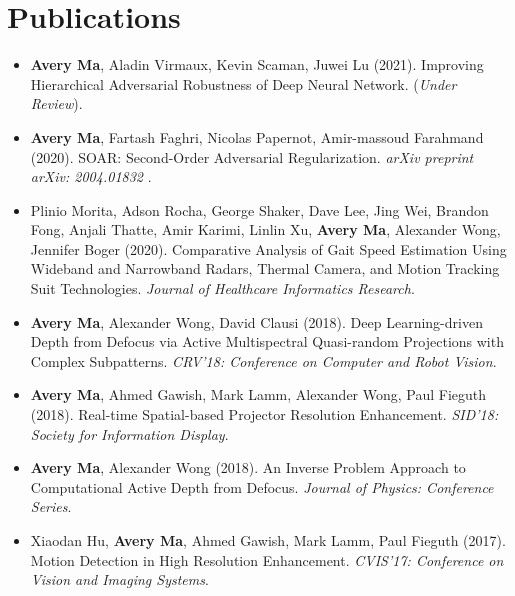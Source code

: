 \section*{Publications}
    \vspace{\postsubhead}
    \begin{adjustwidth}{\indentleft}{\indentright}
        \begin{itemize}
            \setlength\itemsep{0.6em}
            
            \item \textbf{Avery Ma}, Aladin Virmaux, Kevin Scaman, Juwei Lu (2021). Improving Hierarchical Adversarial Robustness of Deep Neural Network. (\textit{Under Review}).
            
            \item \textbf{Avery Ma}, Fartash Faghri, Nicolas Papernot, Amir-massoud Farahmand (2020). SOAR: Second-Order Adversarial Regularization. \emph{arXiv preprint arXiv: 2004.01832} .
            
            \item Plinio Morita, Adson Rocha, George Shaker, Dave Lee, Jing Wei, Brandon Fong, Anjali Thatte, Amir Karimi, Linlin Xu, \textbf{Avery Ma}, Alexander Wong, Jennifer Boger (2020). Comparative Analysis of Gait Speed Estimation Using Wideband and Narrowband Radars, Thermal Camera, and Motion Tracking Suit Technologies. \emph{Journal of Healthcare Informatics Research}.
            
            \item \textbf{Avery Ma}, Alexander Wong, David Clausi (2018). Deep Learning-driven Depth from Defocus via Active Multispectral Quasi-random Projections with Complex Subpatterns. \emph{CRV'18: Conference on Computer and Robot Vision}.
            
            \item \textbf{Avery Ma}, Ahmed Gawish, Mark Lamm, Alexander Wong, Paul Fieguth (2018). Real-time Spatial-based Projector Resolution Enhancement. \emph{SID'18: Society for Information Display}.
            
            \item \textbf{Avery Ma}, Alexander Wong (2018). An Inverse Problem Approach to Computational Active Depth from Defocus. \emph{Journal of Physics: Conference Series}.
            
            \item Xiaodan Hu, \textbf{Avery Ma}, Ahmed Gawish, Mark Lamm, Paul Fieguth (2017). Motion Detection in High Resolution Enhancement. \emph{CVIS'17: Conference on Vision and Imaging Systems}.
            

\end{itemize}
\end{adjustwidth}
